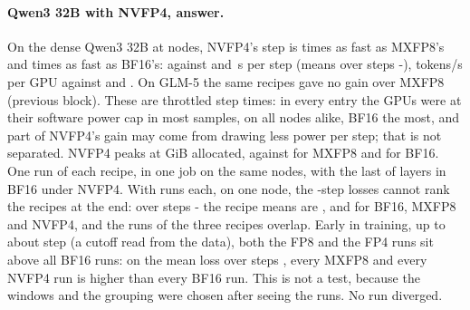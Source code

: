 \paragraph{Qwen3 32B with NVFP4, answer.} On the dense Qwen3 32B at \TriQwFpFourNodes{} nodes, NVFP4's step is \TriQwFpFourSpNvMx{} times as fast as MXFP8's and \TriQwFpFourSpNvBf{} times as fast as BF16's: \TriQwFpFourStepNv{} against \TriQwFpFourStepMx{} and \TriQwFpFourStepBf\,s per step (means over steps \TriQwFpFourFrom-\TriQwFpFourSteps), \TriQwFpFourTokNv{} tokens/s per GPU against \TriQwFpFourTokMx{} and \TriQwFpFourTokBf. On GLM-5 the same recipes gave no gain over MXFP8 (previous block). These are throttled step times: in every entry the GPUs were at their software power cap in most samples, on all nodes alike, BF16 the most, and part of NVFP4's gain may come from drawing less power per step; that is not separated. NVFP4 peaks at \TriQwFpFourMemNv{} GiB allocated, against \TriQwFpFourMemMx{} for MXFP8 and \TriQwFpFourMemBf{} for BF16. One run of each recipe, in one job on the same nodes, with the last \TriQwFpFourBfLast{} of \TriQwFpFourLayers{} layers in BF16 under NVFP4. With \TriQwFpFourLRuns{} runs each, on one node, the \TriQwFpFourLSteps-step losses cannot rank the recipes at the end: over steps \TriQwFpFourWinEndFrom-\TriQwFpFourWinEndTo{} the recipe means are \TriQwFpFourWinEndBf, \TriQwFpFourWinEndMx{} and \TriQwFpFourWinEndNv{} for BF16, MXFP8 and NVFP4, and the runs of the three recipes overlap. Early in training, up to about step \TriQwFpFourCut{} (a cutoff read from the data), both the FP8 and the FP4 runs sit above all BF16 runs: on the mean loss over steps \TriQwFpFourSepWinBoth, every MXFP8 and every NVFP4 run is higher than every BF16 run. This is not a test, because the windows and the grouping were chosen after seeing the runs. No run diverged.

